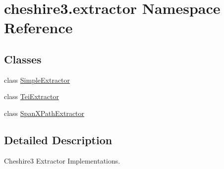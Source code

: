 \hypertarget{namespacecheshire3_1_1extractor}{\section{cheshire3.\-extractor Namespace Reference}
\label{namespacecheshire3_1_1extractor}
}
\subsection*{Classes}
\begin{DoxyCompactItemize}
\item 
class \hyperlink{classcheshire3_1_1extractor_1_1_simple_extractor}{Simple\-Extractor}
\item 
class \hyperlink{classcheshire3_1_1extractor_1_1_tei_extractor}{Tei\-Extractor}
\item 
class \hyperlink{classcheshire3_1_1extractor_1_1_span_x_path_extractor}{Span\-X\-Path\-Extractor}
\end{DoxyCompactItemize}


\subsection{Detailed Description}
\begin{DoxyVerb}Cheshire3 Extractor Implementations.\end{DoxyVerb}
 